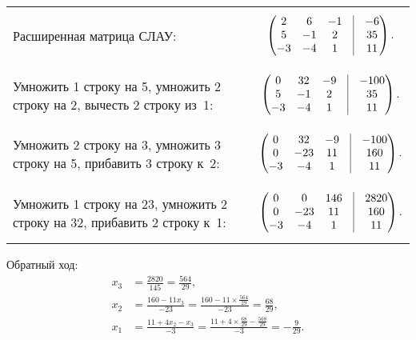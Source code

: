 \documentclass[10pt, a4paper, titlepage]{article}
\begin{document}
\begin{center}
\begin{tabular}{p{}p{}}
    Расширенная матрица СЛАУ: &
    \begin{equation*}
        \begin{pmatrix}
            2 & 6 & -1 & \vrule & -6 \\
            5 & -1 & 2 & \vrule & 35 \\
            -3 & -4 & 1 & \vrule & 11
        \end{pmatrix}.
    \end{equation*}
    \\
    Умножить 1 строку на 5, умножить 2 строку на 2, вычесть 2 строку из~1: &
    \begin{equation*}
        \begin{pmatrix}
            0 & 32 & -9 & \vrule & -100 \\
            5 & -1 & 2 & \vrule & 35 \\
            -3 & -4 & 1 & \vrule & 11
        \end{pmatrix}.
    \end{equation*}
    \\
    Умножить 2 строку на 3, умножить 3 строку на 5, прибавить 3 строку к~2: &
    \begin{equation*}
        \begin{pmatrix}
            0 & 32 & -9 & \vrule & -100 \\
            0 & -23 & 11 & \vrule & 160 \\
            -3 & -4 & 1 & \vrule & 11  
        \end{pmatrix}.
    \end{equation*} 
    \\
    Умножить 1 строку на 23, умножить 2 строку на 32, прибавить 2 строку к~1: &
    \begin{equation*}
        \begin{pmatrix}
            0 & 0 & 146 & \vrule & 2820 \\
            0 & -23 & 11 & \vrule & 160 \\
            -3 & -4 & 1 & \vrule & 11
        \end{pmatrix}.
    \end{equation*}
\end{tabular}
\end{center}


Обратный ход:
\begin{align*}
    x_3 &= \frac{2820}{145}=\frac{564}{29}, \\
    x_2 &= \frac{160-11x_3}{-23}=\frac{160-11\times\frac{564}{29}}{-23}=\frac{68}{29}, \\
    x_1 &= \frac{11+4x_2-x_3}{-3}=\frac{11+4\times\frac{68}{29}-\frac{568}{29}}{-3}=-\frac{9}{29}.
\end{align*}
\end{document}
